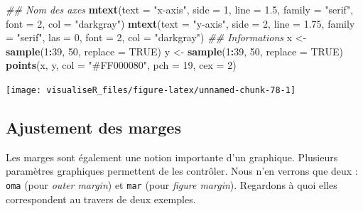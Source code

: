 \documentclass[]{article}
\newenvironment{Shaded}{\begin{snugshade}}{\end{snugshade}}
\newcommand{\CommentTok}[1]{\textcolor[rgb]{0.56,0.35,0.01}{\textit{#1}}}
\newcommand{\DataTypeTok}[1]{\textcolor[rgb]{0.13,0.29,0.53}{#1}}
\newcommand{\DecValTok}[1]{\textcolor[rgb]{0.00,0.00,0.81}{#1}}
\newcommand{\FloatTok}[1]{\textcolor[rgb]{0.00,0.00,0.81}{#1}}
\newcommand{\KeywordTok}[1]{\textcolor[rgb]{0.13,0.29,0.53}{\textbf{#1}}}
\newcommand{\NormalTok}[1]{#1}
\newcommand{\OperatorTok}[1]{\textcolor[rgb]{0.81,0.36,0.00}{\textbf{#1}}}
\newcommand{\OtherTok}[1]{\textcolor[rgb]{0.56,0.35,0.01}{#1}}
\newcommand{\StringTok}[1]{\textcolor[rgb]{0.31,0.60,0.02}{#1}}
\begin{document}
\begin{Shaded}
\begin{Highlighting}[]
\CommentTok{## Nom des axes}
\KeywordTok{mtext}\NormalTok{(}\DataTypeTok{text =} \StringTok{"x-axis"}\NormalTok{, }\DataTypeTok{side =} \DecValTok{1}\NormalTok{, }\DataTypeTok{line =} \FloatTok{1.5}\NormalTok{, }\DataTypeTok{family =} \StringTok{"serif"}\NormalTok{, }\DataTypeTok{font =} \DecValTok{2}\NormalTok{, }\DataTypeTok{col =} \StringTok{"darkgray"}\NormalTok{)}
\KeywordTok{mtext}\NormalTok{(}\DataTypeTok{text =} \StringTok{"y-axis"}\NormalTok{, }\DataTypeTok{side =} \DecValTok{2}\NormalTok{, }\DataTypeTok{line =} \FloatTok{1.75}\NormalTok{, }\DataTypeTok{family =} \StringTok{"serif"}\NormalTok{, }\DataTypeTok{las =} \DecValTok{0}\NormalTok{, }\DataTypeTok{font =} \DecValTok{2}\NormalTok{, }\DataTypeTok{col =} \StringTok{"darkgray"}\NormalTok{)}
\CommentTok{## Informations}
\NormalTok{x <-}\StringTok{ }\KeywordTok{sample}\NormalTok{(}\DecValTok{1}\OperatorTok{:}\DecValTok{39}\NormalTok{, }\DecValTok{50}\NormalTok{, }\DataTypeTok{replace =} \OtherTok{TRUE}\NormalTok{)}
\NormalTok{y <-}\StringTok{ }\KeywordTok{sample}\NormalTok{(}\DecValTok{1}\OperatorTok{:}\DecValTok{39}\NormalTok{, }\DecValTok{50}\NormalTok{, }\DataTypeTok{replace =} \OtherTok{TRUE}\NormalTok{)}
\KeywordTok{points}\NormalTok{(x, y, }\DataTypeTok{col =} \StringTok{"#FF000080"}\NormalTok{, }\DataTypeTok{pch =} \DecValTok{19}\NormalTok{, }\DataTypeTok{cex =} \DecValTok{2}\NormalTok{)}
\end{Highlighting}
\end{Shaded}

\begin{center}\texttt{[image: visualiseR\_files/figure-latex/unnamed-chunk-78-1]} \end{center}

\hypertarget{ajustement-des-marges}{%
\subsection{Ajustement des marges}\label{ajustement-des-marges}}

Les marges sont également une notion importante d'un graphique. Plusieurs paramètres graphiques permettent de les contrôler. Nous n'en verrons que deux : \texttt{oma} (pour \emph{outer margin}) et \texttt{mar} (pour \emph{figure margin}). Regardons à quoi elles correspondent au travers de deux exemples.
\end{document}
